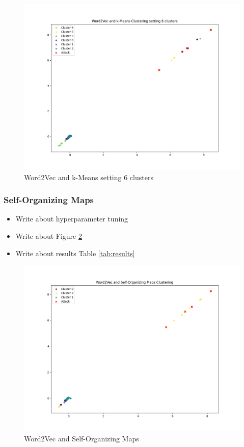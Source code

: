 \documentclass[
    fontsize=12pt,
    headings=small,
    parskip=half,           %
    bibliography=totoc,
    numbers=noenddot,       %
    open=any,               %
    ]{scrreprt}
\begin{document}
\begin{figure}[H]
	\caption{Word2Vec and k-Means setting 6 clusters}
	\label{fig:kmeans_clusters_6}
	\sffamily\footnotesize
	\includegraphics[width=1\textwidth]{pic/k_means_6.png}
	\unitlength=0.75mm
	\linethickness{0.4pt}
\end{figure}

\subsubsection{Self-Organizing Maps}
\begin{itemize}
	\item Write about hyperparameter tuning
	\item Write about Figure \ref{fig:som_clusters}
	\item Write about results Table \ref{tab:results}
\end{itemize}

\begin{figure}[H]
	\caption{Word2Vec and Self-Organizing Maps}
	\label{fig:som_clusters}
	\sffamily\footnotesize
	\includegraphics[width=1\textwidth]{pic/som_final.png}
	\unitlength=0.75mm
	\linethickness{0.4pt}
\end{figure}
\end{document}
